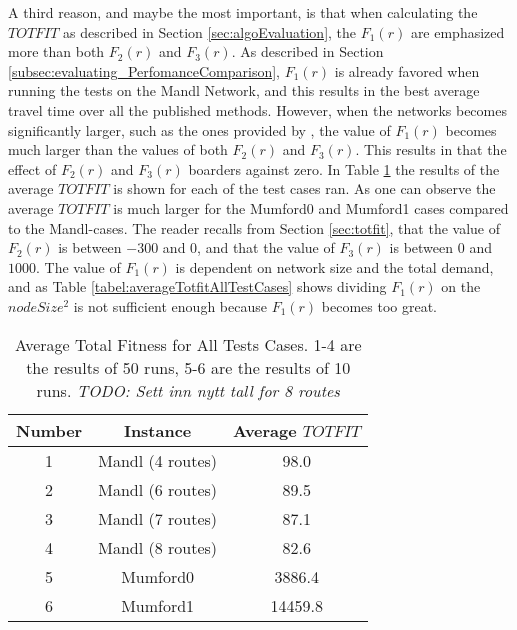 A third reason, and maybe the most important, is that when calculating the $TOTFIT$ as described in Section \vref{sec:algoEvaluation}, the $F_1(r)$ are emphasized more than both $F_2(r)$ and $F_3(r)$. As described in Section \vref{subsec:evaluating_PerfomanceComparison}, $F_1(r)$ is already favored when running the tests on the Mandl Network, and this results in the best average travel time over all the published methods. However, when the networks becomes significantly larger, such as the ones provided by \citet{mumford13}, the value of $F_1(r)$ becomes much larger than the values of both $F_2(r)$ and $F_3(r)$. This results in that the effect of $F_2(r)$ and $F_3(r)$ boarders against zero. In Table \ref{tabel:averageTotfitAllTestCases} the results of the average $TOTFIT$ is shown for each of the test cases ran. As one can observe the average $TOTFIT$ is much larger for the Mumford0 and Mumford1 cases compared to the Mandl-cases. The reader recalls from Section \vref{sec:totfit}, that the value of $F_2(r)$ is between $-300$ and $0$, and that the value of $F_3(r)$ is between $0$ and $1000$. The value of $F_1(r)$ is dependent on network size and the total demand, and as Table \vref{tabel:averageTotfitAllTestCases} shows dividing $F_1(r)$ on the $nodeSize^2$ is not sufficient enough because $F_1(r)$ becomes too great. 

\begin{table}[H]
    \centering
    \hspace*{-1.0cm}
    \begin{tabular}{|c|c|c|}
        \hline
        \textbf{Number} & \textbf{Instance} & \textbf{Average $TOTFIT$}\\
        \hline
        1 & Mandl (4 routes) & 98.0\\
        \hline
        2 & Mandl (6 routes) & 89.5\\
        \hline
        3 & Mandl (7 routes) & 87.1\\
        \hline
        4 & Mandl (8 routes) & 82.6\\
        \hline
        5 & Mumford0 & 3886.4\\
        \hline
        6 & Mumford1 & 14459.8\\
        \hline
    \end{tabular}
    \caption{Average Total Fitness for All Tests Cases. 1-4 are the results of 50 runs, 5-6 are the results of 10 runs. \emph{\color{blue} TODO: Sett inn nytt tall for 8 routes}}
    \label{tabel:averageTotfitAllTestCases}
\end{table}
 
